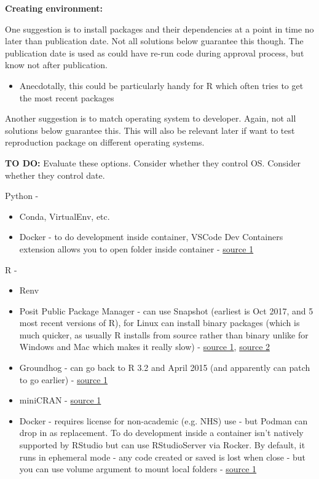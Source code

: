 \textbf{Creating environment:}

One suggestion is to install packages and their dependencies at a point in time no later than publication date. Not all solutions below guarantee this though. The publication date is used as could have re-run code during approval process, but know not after publication.
\begin{itemize}
    \item Anecdotally, this could be particularly handy for R which often tries to get the most recent packages
\end{itemize}

Another suggestion is to match operating system to developer. Again, not all solutions below guarantee this. This will also be relevant later if want to test reproduction package on different operating systems.

\textbf{TO DO:} Evaluate these options. Consider whether they control OS. Consider whether they control date.

Python -
\begin{itemize}
    \item Conda, VirtualEnv, etc.
    \item Docker - to do development inside container, VSCode Dev Containers extension allows you to open folder inside container - \href{https://code.visualstudio.com/docs/devcontainers/containers}{source 1}
\end{itemize}

R -
\begin{itemize}
    \item Renv
    \item Posit Public Package Manager - can use Snapshot (earliest is Oct 2017, and 5 most recent versions of R), for Linux can install binary packages (which is much quicker, as usually R installs from source rather than binary unlike for Windows and Mac which makes it really slow) - \href{https://packagemanager.posit.co/client/#/repos/cran/setup}{source 1}, \href{https://docs.posit.co/faq/p3m-faq/#frequently-asked-questions}{source 2}
    \item Groundhog - can go back to R 3.2 and April 2015 (and apparently can patch to go earlier) - \href{https://www.brodrigues.co/blog/2023-01-12-repro_r/}{source 1}
    \item miniCRAN - \href{https://learn.microsoft.com/en-us/sql/machine-learning/package-management/create-a-local-package-repository-using-minicran?view=sql-server-ver16}{source 1}
    \item Docker - requires license for non-academic (e.g. NHS) use - but Podman can drop in as replacement. To do development inside a container isn't natively supported by RStudio but can use RStudioServer via Rocker. By default, it runs in ephemeral mode - any code created or saved is lost when close - but you can use volume argument to mount local folders - \href{https://towardsdatascience.com/running-rstudio-inside-a-container-e9db5e809ff8}{source 1}
\end{itemize}

